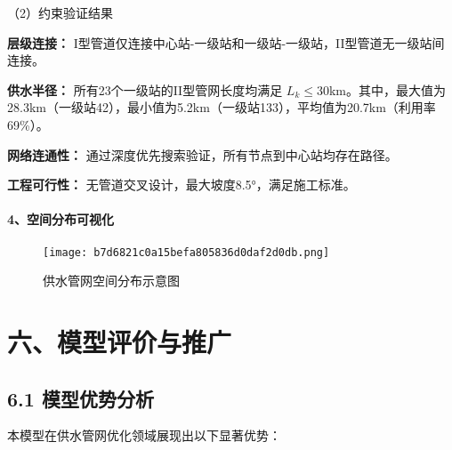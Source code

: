 \documentclass[12pt,a4paper]{article}
\begin{document}
\vspace{0.5em}
（2）约束验证结果

\textbf{层级连接：} I型管道仅连接中心站-一级站和一级站-一级站，II型管道无一级站间连接。

\vspace{0.7em}
\textbf{供水半径：} 所有23个一级站的II型管网长度均满足 $L_k \leq 30$km。其中，最大值为28.3km（一级站42），最小值为5.2km（一级站133），平均值为20.7km（利用率69\%）。

\vspace{0.7em}
\textbf{网络连通性：} 通过深度优先搜索验证，所有节点到中心站均存在路径。

\vspace{0.7em}
\textbf{工程可行性：} 无管道交叉设计，最大坡度8.5°，满足施工标准。

\vspace{1.5em}
\paragraph{4、空间分布可视化}
\begin{figure}[H]
    \centering
    \texttt{[image: b7d6821c0a15befa805836d0daf2d0db.png]}
    \caption{供水管网空间分布示意图}
    \label{fig:pipeline-distribution}
\end{figure}
\FloatBarrier

\section*{六、模型评价与推广}
\subsection*{6.1 模型优势分析}
本模型在供水管网优化领域展现出以下显著优势：
\end{document}
